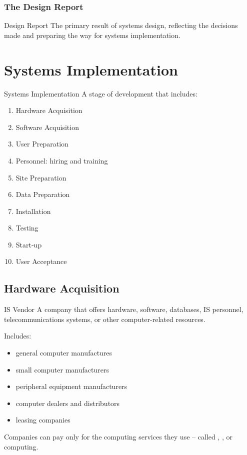 \documentclass[\main/notes.tex]{subfiles}
\begin{document}
				\subsubsection{The Design Report}
					\begin{definition}{Design Report}
						The primary result of systems design, reflecting the decisions made and preparing the way for systems implementation.
					\end{definition}

		\pagebreak
		\section{Systems Implementation}
			\begin{definition}{Systems Implementation}
				A stage of development that includes:
				\begin{multicols}{2}
					\begin{enumerate}[nosep]
						\item Hardware Acquisition
						\item Software Acquisition
						\item User Preparation
						\item Personnel: hiring and training
						\item Site Preparation
						\item Data Preparation
						\item Installation
						\item Testing
						\item Start-up
						\item User Acceptance
					\end{enumerate}
				\end{multicols}
			\end{definition}
			\subsection{Hardware Acquisition}
				\begin{definition}{IS Vendor}
					A company that offers hardware, software, databases, IS personnel, telecommunications systems, or other computer-related resources.

					Includes:
					\begin{multicols}{2}
						\begin{itemize}[nosep]
							\item general computer manufactures
							\item small computer manufacturers
							\item peripheral equipment manufacturers
							\item computer dealers and distributors
							\item leasing companies
						\end{itemize}
					\end{multicols}

					Companies can pay only for the computing services they use -- called , , or \concept{utility} computing.
				\end{definition}
\end{document}
